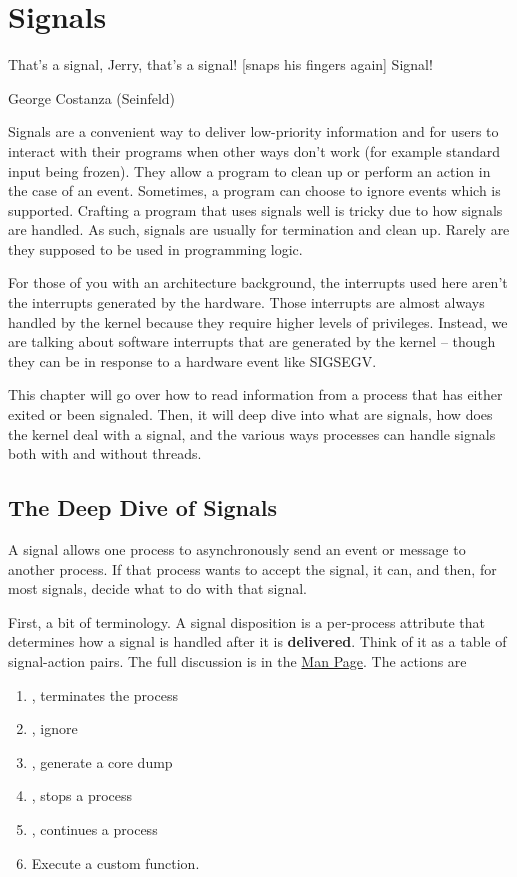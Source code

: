 \chapter{Signals}

\epigraph{That's a signal, Jerry, that's a signal! [snaps his fingers again] Signal!}{George Costanza (Seinfeld)}

Signals are a convenient way to deliver low-priority information and for users to interact with their programs when other ways don't work (for example standard input being frozen).
They allow a program to clean up or perform an action in the case of an event.
Sometimes, a program can choose to ignore events which is supported.
Crafting a program that uses signals well is tricky due to how signals are handled.
As such, signals are usually for termination and clean up.
Rarely are they supposed to be used in programming logic.

For those of you with an architecture background, the interrupts used here aren't the interrupts generated by the hardware.
Those interrupts are almost always handled by the kernel because they require higher levels of privileges.
Instead, we are talking about software interrupts that are generated by the kernel -- though they can be in response to a hardware event like SIGSEGV.

This chapter will go over how to read information from a process that has either exited or been signaled.
Then, it will deep dive into what are signals, how does the kernel deal with a signal, and the various ways processes can handle signals both with and without threads.

\section{The Deep Dive of Signals}

A signal allows one process to asynchronously send an event or message to another process.
If that process wants to accept the signal, it can, and then, for most signals, decide what to do with that signal.

First, a bit of terminology.
A signal disposition is a per-process attribute that determines how a signal is handled after it is \textbf{delivered}.
Think of it as a table of signal-action pairs.
The full discussion is in the \href{http://man7.org/linux/man-pages/man7/signal.7.html}{Man Page}.
The actions are
\begin{enumerate}
  \item {}, terminates the process
  \item {}, ignore
  \item {}, generate a core dump
  \item {}, stops a process
  \item {}, continues a process
  \item Execute a custom function.
\end{enumerate}


